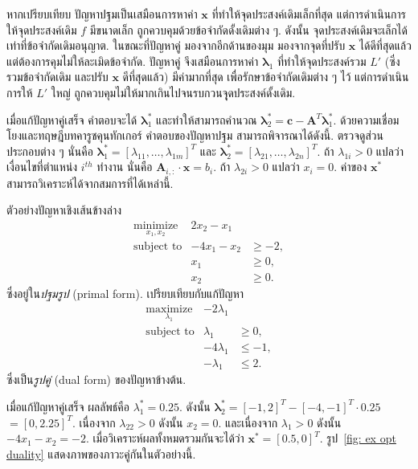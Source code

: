 \begin{Exercise}
หากเปรียบเทียบ 
ปัญหาปฐมเป็นเสมือนการหาค่า $\bm{x}$ ที่ทำให้จุดประสงค์เดิมเล็กที่สุด 
แต่การดำเนินการให้จุดประสงค์เดิม $f$ มีขนาดเล็ก ถูกควบคุมด้วยข้อจำกัดดั้งเดิมต่าง ๆ.
ดังนั้น จุดประสงค์เดิมจะเล็กได้เท่าที่ข้อจำกัดเดิมอนุญาต.
ในขณะที่ปัญหาคู่ มองจากอีกด้านของมุม
มองจากจุดที่ปรับ $\bm{x}$ ได้ดีที่สุดแล้ว แต่ต้องการคุมไม่ให้ละเมิดข้อจำกัด.
ปัญหาคู่ จึงเสมือนการหาค่า $\bm{\lambda}_1$ ที่ทำให้จุดประสงค์รวม $L'$ (ซึ่งรวมข้อจำกัดเดิม และปรับ $\bm{x}$ ดีที่สุดแล้ว) 
มีค่ามากที่สุด เพื่อรักษาข้อจำกัดเดิมต่าง ๆ ไว้
แต่การดำเนินการให้ $L'$ ใหญ่ ถูกควบคุมไม่ให้มากเกินไปจนรบกวนจุุดประสงค์ดั้งเดิม.

เมื่อแก้ปัญหาคู่เสร็จ คำตอบจะได้ $\bm{\lambda}_1^\ast$ และทำให้สามารถคำนวณ $\bm{\lambda}_2^\ast = \bm{c} - \bm{A}^T \bm{\lambda}_1^\ast$.
ด้วยความเชื่อมโยงและทฤษฎีบทคารูชคุนทักเกอร์ คำตอบของปัญหาปฐม สามารถพิจารณาได้ดังนี้.
ตรวจดูส่วนประกอบต่าง ๆ นั่นคือ $\bm{\lambda}_1^\ast = [\lambda_{11}, \ldots, \lambda_{1m}]^T$
และ $\bm{\lambda}_2^\ast = [\lambda_{21}, \ldots, \lambda_{2n}]^T$.
ถ้า $\lambda_{1i} > 0$ แปลว่า เงื่อนไขที่ตำแหน่ง $i^{th}$ ทำงาน นั่นคือ $\bm{A}_{i,:} \cdot \bm{x} = b_i$.
ถ้า $\lambda_{2i} > 0$ แปลว่า $x_i = 0$.
ค่าของ $\bm{x}^\ast$ สามารถวิเคราะห์ได้จากสมการที่ได้เหล่านี้.

ตัวอย่างปัญหาเชิงเส้นข้างล่าง
\begin{eqnarray}
\underset{x_1, x_2}{\mathrm{minimize}} & 2 x_2 - x_1 & 
\nonumber \\
\mbox{subject to} & -4 x_1 - x_2 & \geq -2, 
\nonumber \\
& x_1        & \geq 0,
\nonumber \\
& x_2        & \geq 0.
\nonumber
\end{eqnarray}
ซึ่งอยู่ใน\textit{ปฐมรูป} (primal form).
เปรียบเทียบกับแก้ปัญหา
\begin{eqnarray}
\underset{\lambda_1}{\mathrm{maximize}} & -2 \lambda_1 & 
\nonumber \\
\mbox{subject to} & \lambda_1 & \geq 0, 
\nonumber \\
& -4 \lambda_1        & \leq -1,
\nonumber \\
& -\lambda_1        & \leq 2.
\nonumber
\end{eqnarray}
ซึ่งเป็น\textit{รูปคู่} (dual form) ของปัญหาข้างต้น.

เมื่อแก้ปัญหาคู่เสร็จ ผลลัพธ์คือ $\lambda_1^\ast = 0.25$.
ดังนั้น $\bm{\lambda}_2^\ast = [-1, 2]^T - [-4, -1]^T \cdot 0.25$
$= [0, 2.25]^T$. 
เนื่องจาก $\lambda_{22} > 0$ ดังนั้น $x_2 = 0$.
และเนื่องจาก $\lambda_1 > 0$ ดังนั้น $-4 x_1 - x_2 = -2$.
เมื่อวิเคราะห์ผลทั้งหมดรวมกันจะได้ว่า $\bm{x}^\ast = [0.5, 0]^T$.
รูป~\ref{fig: ex opt duality}
แสดงภาพของภาวะคู่กันในตัวอย่างนี้.


\end{Exercise}
